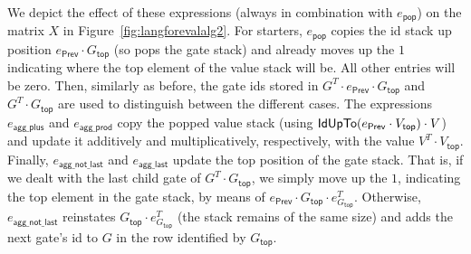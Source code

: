We depict the effect of these expressions (always in combination with $e_{\mathsf{pop}}$) on the matrix $X$ in Figure~\ref{fig:langforevalalg2}.
For starters, $e_{\mathsf{pop}}$ copies the id stack up position $e_{\mathsf{Prev}}\cdot G_{\mathsf{top}}$ (so pops
the gate stack) and already moves up the $1$ indicating where the top element of the value stack will be. All other
entries will be zero. Then, similarly as before, the gate ids stored in $G^T\cdot e_{\mathsf{Prev}}\cdot G_{\mathsf{top}}$ and $G^T\cdot G_{\mathsf{top}}$ are used to distinguish between the different cases. The expressions $e_{\mathsf{agg\_plus}}$ and $e_{\mathsf{agg\_prod}}$ copy the popped value stack (using $\mathsf{IdUpTo}(e_{\mathsf{Prev}}\cdot V_{\mathsf{top}}) \cdot V$) and
update it additively and multiplicatively, respectively, with the value $V^T \cdot V_{\mathsf{top}}$. Finally, $e_{\mathsf{agg\_not\_last}}$ and $e_{\mathsf{agg\_last}}$ update the top position of the gate stack. That is,
if we dealt with the last child gate of $G^T\cdot G_{\mathsf{top}}$, we simply move up the $1$, indicating the top element in the gate stack, by means of $e_{\mathsf{Prev}}\cdot G_{\mathsf{top}} \cdot e_{G_{\mathsf{top}}}^T$. Otherwise, $e_{\mathsf{agg\_not\_last}}$ reinstates $G_{\mathsf{top}}\cdot e_{G_{\mathsf{top}}}^T$ (the stack remains of the same size)
and adds the next gate's id to $G$ in the row identified by $G_{\mathsf{top}}$.
   
